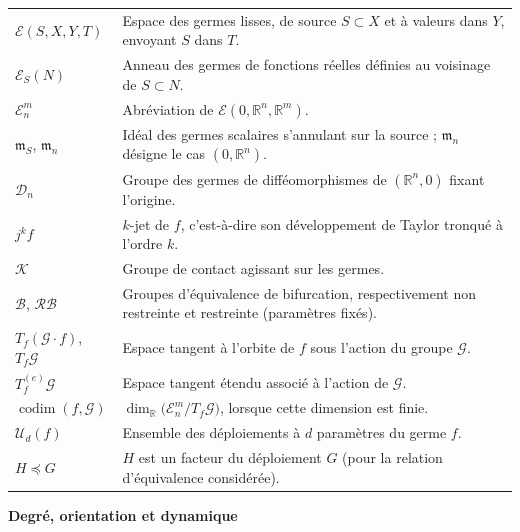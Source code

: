\documentclass[memoire.tex]{subfiles}
\begin{document}
\begin{tabular}{@{}p{}p{}@{}}
$\mathcal E(S,X,Y,T)$
& Espace des germes lisses, de source $S\subset X$ et à valeurs dans $Y$, envoyant $S$ dans $T$.\\
$\mathcal E_S(N)$
& Anneau des germes de fonctions réelles définies au voisinage de $S\subset N$.\\
$\mathcal E_n^m$
& Abréviation de $\mathcal E(0,\mathbb R^n,\mathbb R^m)$.\\
$\mathfrak m_S$, $\mathfrak m_n$
& Idéal des germes scalaires s'annulant sur la source ; $\mathfrak m_n$ désigne le cas $(0,\mathbb R^n)$.\\
$\mathcal D_n$
& Groupe des germes de difféomorphismes de $(\mathbb R^n,0)$ fixant l'origine.\\
$j^k f$
& $k$-jet de $f$, c'est-à-dire son développement de Taylor tronqué à l'ordre $k$.\\
$\mathcal K$
& Groupe de contact agissant sur les germes.\\
$\mathcal B$, $\mathcal{RB}$
& Groupes d'équivalence de bifurcation, respectivement non restreinte et restreinte (paramètres fixés).\\
$T_f(\mathcal G\!\cdot\! f)$, $T_f\mathcal G$
& Espace tangent à l'orbite de $f$ sous l'action du groupe $\mathcal G$.\\
$T_f^{(e)}\mathcal G$
& Espace tangent étendu associé à l'action de $\mathcal G$.\\
$\operatorname{codim}(f,\mathcal G)$
& $\dim_{\mathbb R}\bigl(\mathcal E_n^m/T_f\mathcal G\bigr)$, lorsque cette dimension est finie.\\
$\mathcal U_d(f)$
& Ensemble des déploiements à $d$ paramètres du germe $f$.\\
$H\preccurlyeq G$
& $H$ est un facteur du déploiement $G$ (pour la relation d'équivalence considérée).\\
\end{tabular}

\medskip
\noindent\textbf{Degré, orientation et dynamique}
\smallskip
\end{document}
